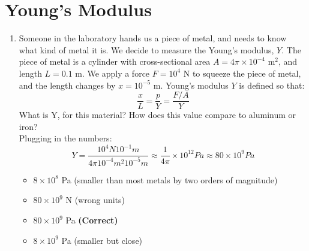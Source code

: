 \documentclass[10pt]{article}
\begin{document}
\section{Young's Modulus}
\begin{enumerate}
\item Someone in the laboratory hands us a piece of metal, and needs to know what kind of metal it is.  We decide to measure the Young's modulus, $Y$.  The piece of metal is a cylinder with cross-sectional area $A = 4\pi \times 10^{-4}$ m$^2$, and length $L = 0.1$ m.  We apply a force $F=10^4$ N to squeeze the piece of metal, and the length changes by $x = 10^{-5}$ m.  Young's modulus $Y$ is defined so that:
\begin{equation}
\frac{x}{L} = \frac{p}{Y} = \frac{F/A}{Y}
\end{equation}
What is Y, for this material?  How does this value compare to aluminum or iron? \\
Plugging in the numbers: \\
\begin{equation}
Y = \frac{10^4 N 10^{-1} m}{4\pi 10^{-4} m^2 10^{-5} m} \approx \frac{1}{4\pi} \times 10^{12} Pa \approx 80 \times 10^{9} Pa
\end{equation}
\begin{itemize}
\item $8 \times 10^{8}$ Pa (smaller than most metals by two orders of magnitude)
\item $80 \times 10^{9}$ N (wrong units)
\item $80 \times 10^{9}$ Pa \textbf{(Correct)}
\item $8 \times 10^{9}$ Pa (smaller but close)
\end{itemize}
\end{enumerate}
\end{document}
